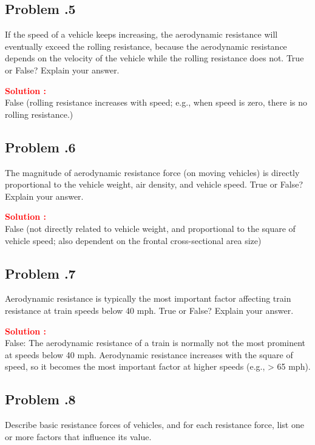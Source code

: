 \documentclass[12pt]{article}
\newcommand{\customsubsection}[1]{
  \subsection*{Problem \thesection.#1}
}
\begin{document}
\customsubsection{5}
If the speed of a vehicle keeps increasing, the aerodynamic resistance will eventually exceed the rolling resistance, because the aerodynamic resistance depends on the velocity of the vehicle while the rolling resistance does not. True or False? Explain your answer. 


\textbf{\textcolor{red}{Solution :}} \\
False (rolling resistance increases with speed; e.g., when speed is zero, there is no rolling resistance.)

\newpage

\customsubsection{6}
The magnitude of aerodynamic resistance force (on moving vehicles) is directly proportional to the vehicle weight, air density, and vehicle speed. True or False? Explain your answer. 


\textbf{\textcolor{red}{Solution :}} \\
False (not directly related to vehicle weight, and proportional to the square of vehicle speed; also dependent on the frontal cross-sectional area size)

\newpage

\customsubsection{7}
Aerodynamic resistance is typically the most important factor affecting train resistance at train speeds below 40 mph. True or False? Explain your answer. 


\textbf{\textcolor{red}{Solution :}} \\
False: The aerodynamic resistance of a train is normally not the most prominent at speeds below 40 mph. Aerodynamic resistance increases with the square of speed, so it becomes the most important factor at higher speeds (e.g., > 65 mph).
\newpage

\customsubsection{8}
Describe basic resistance forces of vehicles, and for each resistance force, list one or more factors that influence its value. 
\end{document}
